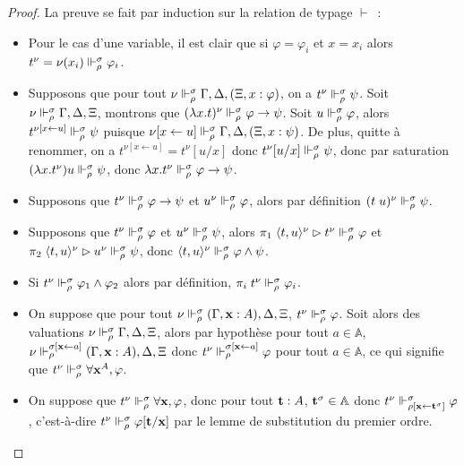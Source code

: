 \documentclass{article}
\begin{document}
\begin{proof}
  La preuve se fait par induction sur la relation de typage $\vdash$~:
  \begin{itemize}
  \item Pour le cas d'une variable, il est clair que si $\varphi = \varphi_i$ et $x = x_i$ alors $t^\nu = \nu(x_i)\Vdash_\rho^\sigma \varphi_i$.
  \item Supposons que pour tout $\nu \Vdash_\rho^\sigma \Gamma,\Delta,(\Xi, x : \varphi)$, on a $t^\nu \Vdash_\rho^\sigma \psi$. Soit $\nu \Vdash_\rho^\sigma \Gamma,\Delta,\Xi$, montrons que $(\lambda x.t)^\nu\Vdash_\rho^\sigma \varphi \to \psi$. Soit $u \Vdash_\rho^\sigma \varphi$, alors $t^{\nu[x \leftarrow u]}\Vdash_\rho^\sigma \psi$ puisque $\nu[x\leftarrow u]\Vdash_\rho^\sigma \Gamma,\Delta,(\Xi, x : \psi)$. De plus, quitte à renommer, on a $t^{\nu[x\leftarrow u]} = t^\nu[u/x]$ donc $t^\nu[u/x]\Vdash_\rho^\sigma \psi$, donc par saturation $(\lambda x.t^\nu) u \Vdash_\rho^\sigma \psi$, donc $\lambda x.t^\nu\Vdash_\rho^\sigma \varphi\to\psi$.
  \item Supposons que $t^\nu\Vdash_\rho^\sigma \varphi \to \psi$ et $u^\nu\Vdash_\rho^\sigma \varphi$, alors par définition $(t\;u)^\nu\Vdash_\rho^\sigma \psi$.
  \item Supposons que $t^\nu\Vdash_\rho^\sigma \varphi$ et $u^\nu\Vdash_\rho^\sigma \psi$, alors $\pi_1\;\langle t,u\rangle^\nu \rhd t^\nu \Vdash_\rho^\sigma \varphi$ et $\pi_2\;\langle t,u\rangle^\nu\rhd u^\nu \Vdash_\rho^\sigma \psi$, donc $\langle t,u\rangle^\nu \Vdash_\rho^\sigma \varphi\land\psi$.
  \item Si $t^\nu \Vdash_\rho^\sigma \varphi_1\land\varphi_2$ alors par définition, $\pi_i\;t^\nu\Vdash_\rho^\sigma \varphi_i$.
  \item On suppose que pour tout $\nu\Vdash_\rho^\sigma (\Gamma, \mathbf{x} : A), \Delta,\Xi$, $t^\nu\Vdash_\rho^\sigma \varphi$. Soit alors des valuations $\nu\Vdash_\rho^\sigma \Gamma,\Delta,\Xi$, alors par hypothèse pour tout $a \in \mathbb A$, $\nu\Vdash_\rho^{\sigma[\mathbf{x}\leftarrow a]}(\Gamma, \mathbf{x} : A), \Delta, \Xi$ donc $t^\nu\Vdash_\rho^{\sigma[\mathbf{x} \leftarrow a]}\varphi$ pour tout $a\in \mathbb A$, ce qui signifie que $t^\nu \Vdash_\rho^\sigma \forall \mathbf{x}^A, \varphi$.
  \item On suppose que $t^\nu\Vdash_\rho^\sigma \forall \mathbf{x}, \varphi$, donc pour tout $\mathbf{t} : A$, $\mathbf{t}^\sigma \in \mathbb A$ donc $t^\nu\Vdash_{\rho[\mathbf{x}\leftarrow \mathbf{t}^\sigma]}^\sigma \varphi$, c'est-à-dire $t^\nu\Vdash_\rho^\sigma \varphi[\mathbf{t}/\mathbf{x}]$ par le lemme de substitution du premier ordre.

\end{itemize}
\end{proof}
\end{document}
